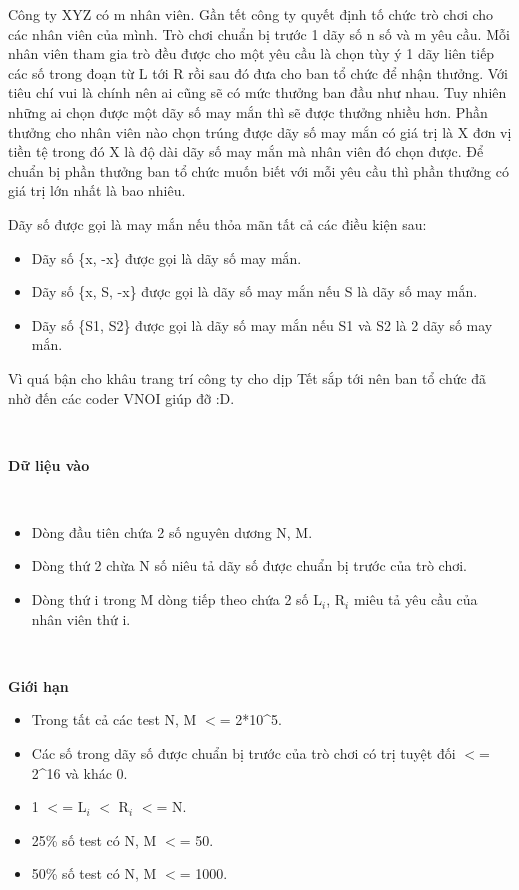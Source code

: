 



Công ty XYZ có m nhân viên. Gần tết công ty quyết định tố chức trò chơi cho các nhân viên của mình. Trò chơi chuẩn bị trước 1 dãy số n số và m yêu cầu. Mỗi nhân viên tham gia trò đều được cho một yêu cầu là chọn tùy ý 1 dãy liên tiếp các số trong đoạn từ L tới R rồi sau đó đưa cho ban tổ chức để nhận thưởng. Với tiêu chí vui là chính nên ai cũng sẽ có mức thưởng ban đầu như nhau. Tuy nhiên những ai chọn được một dãy số may mắn thì sẽ được thưởng nhiều hơn. Phần thưởng cho nhân viên nào chọn trúng được dãy số may mắn có giá trị là X đơn vị tiền tệ trong đó X là độ dài dãy số may mắn mà nhân viên đó chọn được. Để chuẩn bị phần thưởng ban tổ chức muốn biết với mỗi yêu cầu thì phần thưởng có giá trị lớn nhất là bao nhiêu.




Dãy số được gọi là may mắn nếu thỏa mãn tất cả các điều kiện sau:
\begin{itemize}
	\item Dãy số \{x, -x\} được gọi là dãy số may mắn.
	\item Dãy số \{x, S, -x\} được gọi là dãy số may mắn nếu S là dãy số may mắn.
	\item Dãy số \{S1, S2\} được gọi là dãy số may mắn nếu S1 và S2 là 2 dãy số may mắn.
\end{itemize}



\begin{itemize}
\end{itemize}

Vì quá bận cho khâu trang trí công ty cho dịp Tết sắp tới nên ban tổ chức đã nhờ đến các coder VNOI giúp đỡ :D.

 

\textbf{Dữ liệu vào}

 
\begin{itemize}
	\item Dòng đầu tiên chứa 2 số nguyên dương N, M.
	\item Dòng thứ 2 chừa N số niêu tả dãy số được chuẩn bị trước của trò chơi.
	\item Dòng thứ i trong M dòng tiếp theo chứa 2 số L$_i$, R$_i$ miêu tả yêu cầu của nhân viên thứ i.
\end{itemize}

 

\textbf{Giới hạn}

\textbf{
}
\begin{itemize}
	\item Trong tất cả các test N, M $<$= 2*10\textasciicircum5.
	\item Các số trong dãy số được chuẩn bị trước của trò chơi có trị tuyệt đối $<$= 2\textasciicircum16 và khác 0.
	\item 1 $<$= L$_i$ $<$ R$_i$ $<$= N.
	\item 25\% số test có N, M $<$= 50.
	\item 50\% số test có N, M $<$= 1000.
\end{itemize}

